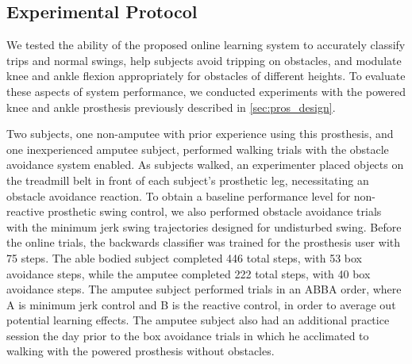 \subsection{Experimental Protocol}

We tested the ability of the proposed online learning system to accurately
classify trips and normal swings, help subjects avoid tripping on obstacles, and
modulate knee and ankle flexion appropriately for obstacles of different
heights. To evaluate these aspects of system performance, we conducted
experiments with the powered knee and ankle prosthesis previously described in
\cref{sec:pros_design}.

Two subjects, one non-amputee with prior experience using this prosthesis, and
one inexperienced amputee subject, performed walking trials with the obstacle
avoidance system enabled.  As subjects walked, an experimenter placed objects on
the treadmill belt in front of each subject's prosthetic leg, necessitating an
obstacle avoidance reaction. To obtain a baseline performance level for
non-reactive prosthetic swing control, we also performed obstacle avoidance
trials with the minimum jerk swing trajectories designed for undisturbed swing.
Before the online trials, the backwards classifier was trained for the
prosthesis user with 75 steps. The able bodied subject completed 446 total
steps, with 53 box avoidance steps, while the amputee completed 222 total steps,
with 40 box avoidance steps. The amputee subject performed trials in an ABBA
order, where A is minimum jerk control and B is the reactive control, in order
to average out potential learning effects. The amputee subject also had an
additional practice session the day prior to the box avoidance trials in which
he acclimated to walking with the powered prosthesis without obstacles.
